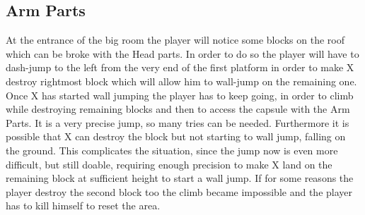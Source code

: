\subsection{Arm Parts}
At the entrance of the big room the player will notice some blocks on the roof which can be broke with the Head parts. In order to do so the player will have to dash-jump to the left from the very end of the first platform in order to make X destroy rightmost block which will allow him to wall-jump on the remaining one. Once X has started wall jumping the player has to keep going, in order to climb while destroying remaining blocks and then to access the capsule with the Arm Parts. It is a very precise jump, so many tries can be needed. Furthermore it is possible that X can destroy the block but not starting to wall jump, falling on the ground. This complicates the situation, since the jump now is even more difficult, but still doable, requiring enough precision to make X land on the remaining block at sufficient height to start a wall jump. If for some reasons the player destroy the second block too the climb became impossible and the player has to kill himself to reset the area.
